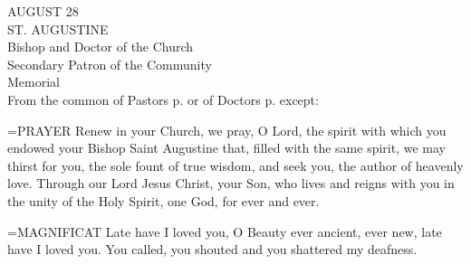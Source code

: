 \begin{center}\normalsize AUGUST 28\\
\footnotesize ST. AUGUSTINE\\
\footnotesize Bishop and Doctor of the Church\\
\footnotesize Secondary Patron of the Community\\
\footnotesize Memorial\\
\footnotesize From the common of Pastors p.     or of Doctors p.     except:\\
\end{center}

\hangindent=\parindent \small{PRAYER 
Renew in your Church, we pray, O Lord,
the spirit with which you endowed
your Bishop Saint Augustine
that, filled with the same spirit,
we may thirst for you,
the sole fount of true wisdom,
and seek you, the author of heavenly love.
Through our Lord Jesus Christ, your Son,
who lives and reigns with you in the unity of the Holy Spirit,
one God, for ever and ever.\\}
 


\hangindent=\parindent \small{MAGNIFICAT  Late have I loved you, O Beauty ever ancient, ever new,
late have I loved you. You called, you shouted and you shattered my
deafness.\\}
 


